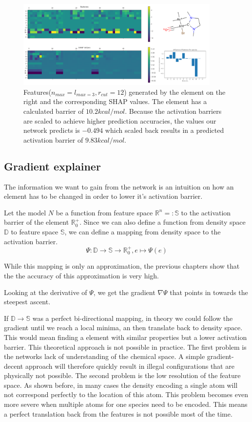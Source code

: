\begin{figure}
    \centering
    \includegraphics[width=0.9\textwidth]{figures/evaluation/SHAP.png}
    \caption{
        Features($n_{max}=l_{max=3}, r_{cut}=12$) generated by the element on the right and the corresponding SHAP values.
        The element has a calculated barrier of $10.2 kcal/mol$.
        Because the activation barriers are scaled to achieve higher prediction accuracies,
        the values our network predicts is $-0.494$ which scaled back results in a predicted activation 
        barrier of $9.83 kcal/mol$.
     }
    \label{fig:shap}
  \end{figure}
  

\subsection{Gradient explainer}

The information we want to gain from the network is an intuition on
how an element has to be changed in order to lower it's activation barrier.

Let the model $N$ be a function from feature space $\mathbb{R}^n =: \mathbb{S}$ to the activation barrier of the element $\mathbb{R}^+_0$.
Since we can also define a function from density space $\mathbb{D}$ to feature space $\mathbb{S}$,
we can define a mapping from density space to the activation barrier.
$$ \Psi : \mathbb{D} \to \mathbb{S} \to \mathbb{R}^+_0, e \mapsto \Psi(e) $$

While this mapping is only an approximation, the previous chapters show that the 
the accuracy of this approximation is very high.

Looking at the derivative of $\Psi$, we get the gradient $\nabla \Psi$ that points in towards the steepest ascent.

If $\mathbb{D} \to \mathbb{S}$ was a perfect bi-directional mapping, in theory we could follow the gradient until we reach 
a local minima, an then translate back to density space.
This would mean finding a element with similar properties but a lower activation barrier.
This theoretical approach is not possible in practice.
The first problem is the networks lack of understanding of the chemical space.
A simple gradient-decent approach will therefore quickly result in illegal configurations 
that are physically not possible.
The second problem is the low resolution of the feature space.
As shown before, in many cases the density encoding a single atom will not correspond perfectly to the location of this atom.
This problem becomes even more severe when multiple atoms for one species need to be encoded.
This means a perfect translation back from the features is not possible most of the time.

